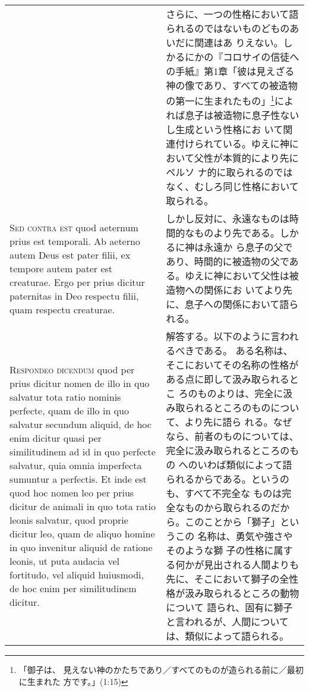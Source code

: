 \documentclass[10pt]{jsarticle} %
\begin{document}
\begin{longtable}{p{21em}p{21em}}
&


さらに、一つの性格において語られるのではないものどものあいだに関連はあ
 りえない。しかるにかの『コロサイの信徒への手紙』第1章「彼は見えざる
 神の像であり、すべての被造物の第一に生まれたもの」\footnote{「御子は、
 見えない神のかたちであり／すべてのものが造られる前に／最初に生まれた
 方です。」(1:15)}によれば息子は被造物に息子性ないし生成という性格にお
 いて関連付けられている。ゆえに神において父性が本質的により先にペルソ
 ナ的に取られるのではなく、むしろ同じ性格において取られる。


\\



{\scshape Sed contra est} quod aeternum prius est temporali. Ab aeterno autem
Deus est pater filii, ex tempore autem pater est creaturae. Ergo per
prius dicitur paternitas in Deo respectu filii, quam respectu
creaturae.

&

しかし反対に、永遠なものは時間的なものより先である。しかるに神は永遠か
 ら息子の父であり、時間的に被造物の父である。ゆえに神において父性は被造物への関係にお
 いてより先に、息子への関係において語られる。

\\



{\scshape Respondeo dicendum} quod per prius dicitur nomen de illo in quo
salvatur tota ratio nominis perfecte, quam de illo in quo salvatur
secundum aliquid, de hoc enim dicitur quasi per similitudinem ad id in
quo perfecte salvatur, quia omnia imperfecta sumuntur a perfectis. Et
inde est quod hoc nomen leo per prius dicitur de animali in quo tota
ratio leonis salvatur, quod proprie dicitur leo, quam de aliquo homine
in quo invenitur aliquid de ratione leonis, ut puta audacia vel
fortitudo, vel aliquid huiusmodi, de hoc enim per similitudinem
dicitur. 

&

解答する。以下のように言われるべきである。
ある名称は、そこにおいてその名称の性格がある点に即して汲み取られるとこ
 ろのものよりは、完全に汲み取られるところのものについて、より先に語ら
 れる。なぜなら、前者のものについては、完全に汲み取られるところのもの
 へのいわば類似によって語られるからである。というのも、すべて不完全な
 ものは完全なものから取られるのだから。このことから「獅子」というこの
 名称は、勇気や強さやそのような獅
 子の性格に属する何かが見出される人間よりも先に、そこにおいて獅子の全性格が汲み取られるところの動物について
語られ、固有に獅子と言われるが、人間については、類似によって語られる。



\end{longtable}
\end{document}
